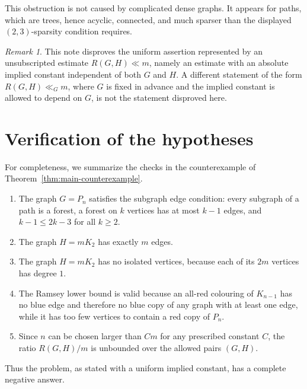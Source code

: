 \documentclass[11pt]{amsart}
\theoremstyle{remark}
\newtheorem{remark}[theorem]{Remark}
\begin{document}
This obstruction is not caused by complicated dense graphs.  It appears for paths, which are trees, hence acyclic, connected, and much sparser than the displayed $(2,3)$-sparsity condition requires.

\begin{remark}
This note disproves the uniform assertion represented by an unsubscripted estimate $R(G,H)\ll m$, namely an estimate with an absolute implied constant independent of both $G$ and $H$.  A different statement of the form $R(G,H)\ll_G m$, where $G$ is fixed in advance and the implied constant is allowed to depend on $G$, is not the statement disproved here.
\end{remark}

\section{Verification of the hypotheses}

For completeness, we summarize the checks in the counterexample of Theorem~\ref{thm:main-counterexample}.

\begin{enumerate}[label=\textup{(\arabic*)}]
    \item The graph $G=P_n$ satisfies the subgraph edge condition: every subgraph of a path is a forest, a forest on $k$ vertices has at most $k-1$ edges, and $k-1\le 2k-3$ for all $k\ge 2$.
    \item The graph $H=mK_2$ has exactly $m$ edges.
    \item The graph $H=mK_2$ has no isolated vertices, because each of its $2m$ vertices has degree $1$.
    \item The Ramsey lower bound is valid because an all-red colouring of $K_{n-1}$ has no blue edge and therefore no blue copy of any graph with at least one edge, while it has too few vertices to contain a red copy of $P_n$.
    \item Since $n$ can be chosen larger than $Cm$ for any prescribed constant $C$, the ratio $R(G,H)/m$ is unbounded over the allowed pairs $(G,H)$.
\end{enumerate}

Thus the problem, as stated with a uniform implied constant, has a complete negative answer.
\end{document}
